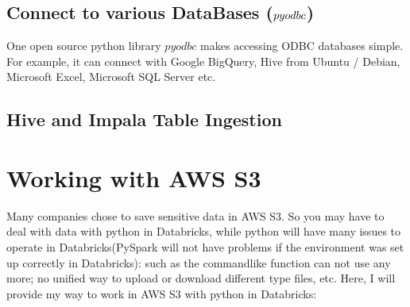 \documentclass[letterpaper,12pt,english]{sphinxmanual}
\begin{document}
\section{Connect to various DataBases (\protect\(pyodbc\protect\))}
\label{\detokenize{ingest:connect-to-various-databases-pyodbc}}
\sphinxAtStartPar
One open source python library \(pyodbc\) makes accessing ODBC databases simple.
For example, it can connect with Google BigQuery, Hive from Ubuntu / Debian, Microsoft Excel, Microsoft SQL Server etc.

\begin{sphinxVerbatim}[commandchars=\\\{\}]
 
  
  

   
   
\end{sphinxVerbatim}


\section{Hive and Impala Table Ingestion}
\label{\detokenize{ingest:hive-and-impala-table-ingestion}}
\begin{figure}[htbp]
\centering

\noindent{}
\end{figure}


\chapter{Working with AWS S3}
\label{\detokenize{s3:working-with-aws-s3}}\label{\detokenize{s3::doc}}
\sphinxAtStartPar
Many companies chose to save sensitive data in AWS S3. So you may have to deal
with data with python in Databricks, while python will have many issues to
operate in Databricks(PySpark will not have problems if the environment was
set up correctly in Databricks): such as the  command\sphinxhyphen{}like
function can not use any more; no unified way to upload or download different
type files, etc. Here, I will provide my way to work in AWS S3 with python in
Databricks:
\end{document}
